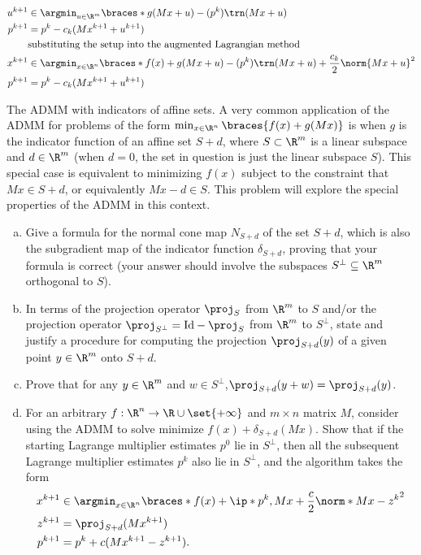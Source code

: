 \documentclass{article}
\theoremstyle{plain}
\theoremstyle{definition}
\theoremstyle{remark}
\begin{document}
\begin{solution}
\begin{enumerate}[(a)]
{\begin{align*}
                u^{k+1} &\in \argmin_{u\in\R^m}\braces*{g(Mx+u)-(p^k)\trn (Mx+u)} \\
                p^{k+1} &= p^k-c_k(Mx^{k+1}+u^{k+1}) \\
                &\text{substituting the setup into the augmented Lagrangian method} \\
                x^{k+1} &\in \argmin_{x\in\R^n}\braces*{f(x)+g(Mx+u)-(p^k)\trn (Mx+u)+\frac{c_k}{2}\norm{Mx+u}^2} \\
                p^{k+1} &= p^k-c_k(Mx^{k+1}+u^{k+1}) 
            \end{align*}
        }
    \end{enumerate}
\end{solution}

\begin{problem}
    {The ADMM with indicators of affine sets.}
    A very common application of the ADMM for problems of the form $\min_{x\in\R^n}\braces{f(x)+g(Mx)}$ is when $g$ is the indicator function of an affine set $S+d$, where $S\subset\R^m$ is a linear subspace and $d\in\R^m$ (when $d=0$, the set in question is just the linear subspace $S$). This special case is equivalent to minimizing $f(x)$ subject to the constraint that $Mx\in S+d$, or equivalently $Mx-d\in S$. This problem will explore the special properties of the ADMM in this context.
    \begin{enumerate}[(a)]
        \item Give a formula for the normal cone map $N_{S+d}$ of the set $S+d$, which is also the subgradient map of the indicator function $\delta_{S+d}$, proving that your formula is correct (your answer should involve the subspaces $S^{\bot}\subseteq\R^m$ orthogonal to $S$).
        \item In terms of the projection operator $\proj_S$ from $\R^m$ to $S$ and/or the projection operator $\proj_{S^{\bot}}=\mathrm{Id}-\proj_S$ from $\R^m$ to $S^{\bot}$, state and justify a procedure for computing the projection $\proj_{S+d}(y)$ of a given point $y\in\R^m$ onto $S+d$.
        \item Prove that for any $y\in\R^m$ and $w\in S^{\bot}$,$\proj_{S+d}(y+w)=\proj_{S+d}(y)$.
        \item For an arbitrary $f:\R^n\rightarrow\R\cup\set{+\infty}$ and $m\times n$ matrix $M$, consider using the ADMM to solve minimize $f(x)+\delta_{S+d}(Mx)$. Show that if the starting Lagrange multiplier estimates $p^0$ lie in $S^{\bot}$, then all the subsequent Lagrange multiplier estimates $p^k$ also lie in $S^{\bot}$, and the algorithm takes the form
        \begin{align*}
            x^{k+1} &\in \argmin_{x\in\R^n}\braces*{f(x)+\ip*{p^k,Mx}+\frac{c}{2}\norm*{Mx-z^k}^2} \\
            z^{k+1} &= \proj_{S+d}(Mx^{k+1}) \\
            p^{k+1} &= p^k+c(Mx^{k+1}-z^{k+1}).
        \end{align*}
    \end{enumerate}
\end{problem}
\end{document}
